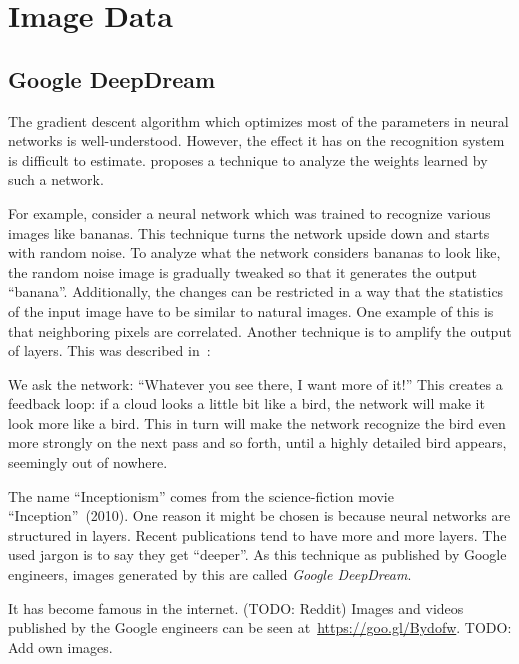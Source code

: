 
\section{Image Data}%
\label{sec:images}%

\subsection{Google DeepDream}%
\label{subsec:google-deepdream}%
The gradient descent algorithm which optimizes most of the parameters in neural
networks is well-understood. However, the effect it has on the recognition
system is difficult to estimate. \cite{inceptionism2015} proposes a technique
to analyze the weights learned by such a network.

For example, consider a neural network which was trained to recognize various
images like bananas. This technique turns the network upside down and starts
with random noise. To analyze what the network considers bananas to look like,
the random noise image is gradually tweaked so that it generates the output
\enquote{banana}. Additionally, the changes can be restricted in a way that the
statistics of the input image have to be similar to natural images. One example
of this is that neighboring pixels are correlated.
\goodbreak
Another technique is to amplify the output of layers. This was described
in~\cite{inceptionism2015}:\nobreak%
\begin{displayquote}
We ask the network: \enquote{Whatever you see there, I want more of it!} This
creates a feedback loop: if a cloud looks a little bit like a bird, the network
will make it look more like a bird. This in turn will make the network
recognize the bird even more strongly on the next pass and so forth, until a
highly detailed bird appears, seemingly out of nowhere.
\end{displayquote}

The name \enquote{Inceptionism} comes from the science-fiction movie
\enquote{Inception}~(2010). One reason it might be chosen is because neural
networks are structured in layers. Recent publications tend to have more and
more layers. The used jargon is to say they get \enquote{deeper}. As this
technique as published by Google engineers, images generated by this are called
\textit{Google DeepDream}.

It has become famous in the internet. (TODO: Reddit)
Images and videos published by the Google engineers can be seen
at~\href{https://goo.gl/Bydofw}{https://goo.gl/Bydofw}. TODO: Add own images.



